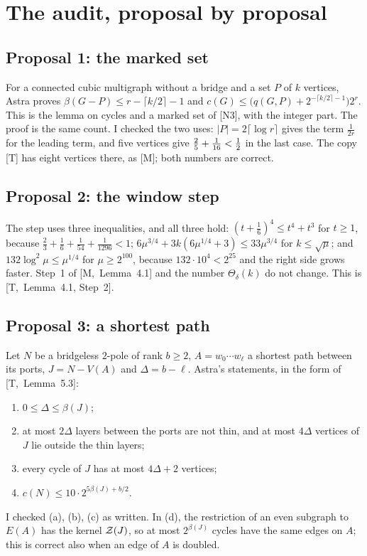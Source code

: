\documentclass[11pt]{article}
\newcommand{\M}[1]{[M,~#1]}
\newcommand{\T}[1]{[T,~#1]}
\begin{document}
\section{The audit, proposal by proposal}\label{sec:audit}

\subsection{Proposal 1: the marked set}

For a connected cubic multigraph without a bridge and a set $P$ of $k$ vertices, Astra proves
$\beta(G-P)\le r-\lceil k/2\rceil-1$ and
$c(G)\le\bigl(q(G,P)+2^{-\lceil k/2\rceil-1}\bigr)2^{r}$. This is the lemma on cycles and a
marked set of [N3], with the integer part. The proof is the same count. I checked the two uses:
$|P|=2\lceil\log r\rceil$ gives the term $\frac1{2r}$ for the leading term, and five vertices
give $\frac25+\frac1{16}<\tfrac12$ in the last case. The copy [T] has eight vertices there, as [M];
both numbers are correct.

\subsection{Proposal 2: the window step}

The step uses three inequalities, and all three hold: $(t+\frac16)^{4}\le t^{4}+t^{3}$ for
$t\ge1$, because $\frac23+\frac16+\frac1{54}+\frac1{1296}<1$;
$6\mu^{3/4}+3k(6\mu^{1/4}+3)\le33\mu^{3/4}$ for $k\le\sqrt\mu$; and
$132\log^{2}\mu\le\mu^{1/4}$ for $\mu\ge2^{100}$, because $132\cdot10^{4}<2^{25}$ and the right
side grows faster. Step~1 of \M{Lemma~4.1} and the number $\Theta_\delta(k)$ do not change. This
is \T{Lemma~4.1, Step~2}.

\subsection{Proposal 3: a shortest path}\label{sec:path}

Let $N$ be a bridgeless $2$-pole of rank $b\ge2$, $A=w_0\cdots w_\ell$ a shortest path between
its ports, $J=N-V(A)$ and $\Delta=b-\ell$. Astra's statements, in the form of \T{Lemma~5.3}:
\begin{enumerate}[leftmargin=2.2em]
\item[(a)] $0\le\Delta\le\beta(J)$;
\item[(b)] at most $2\Delta$ layers between the ports are not thin, and at most $4\Delta$
vertices of $J$ lie outside the thin layers;
\item[(c)] every cycle of $J$ has at most $4\Delta+2$ vertices;
\item[(d)] $c(N)\le10\cdot2^{5\beta(J)+b/2}$.
\end{enumerate}
I checked (a), (b), (c) as written. In (d), the restriction of an even subgraph to $E(A)$ has
the kernel $\mathcal{Z}(J)$, so at most $2^{\beta(J)}$ cycles have the same edges on $A$; this is correct
also when an edge of $A$ is doubled.
\end{document}
